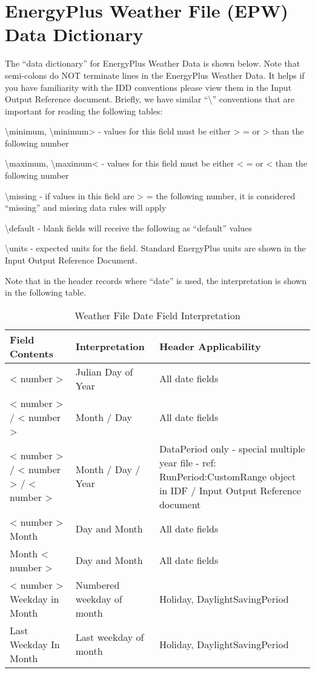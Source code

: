 \section{EnergyPlus Weather File (EPW) Data Dictionary}\label{energyplus-weather-file-epw-data-dictionary}

The ``data dictionary'' for EnergyPlus Weather Data is shown below. Note that semi-colons do NOT terminate lines in the EnergyPlus Weather Data. It helps if you have familiarity with the IDD conventions please view them in the Input Output Reference document. Briefly, we have similar ``\textbackslash{}'' conventions that are important for reading the following tables:

\textbackslash{}minimum, \textbackslash{}minimum\textgreater{} - values for this field must be either \textgreater{} = or \textgreater{} than the following number

\textbackslash{}maximum, \textbackslash{}maximum\textless{} - values for this field must be either \textless{} = or \textless{} than the following number

\textbackslash{}missing - if values in this field are \textgreater{} = the following number, it is considered ``missing'' and missing data rules will apply

\textbackslash{}default - blank fields will receive the following as ``default'' values

\textbackslash{}units - expected units for the field. Standard EnergyPlus units are shown in the Input Output Reference Document.

Note that in the header records where ``date'' is used, the interpretation is shown in the following table.

\begin{longtable}[c]{p{1.5in}p{1.5in}p{2.99in}}
\caption{Weather File Date Field Interpretation \protect \label{table:weather-file-date-field-interpretation}}\\
\toprule 
Field Contents & Interpretation & Header Applicability \tabularnewline \midrule
\endhead
< number > & Julian Day of Year & All date fields \tabularnewline
< number >  /  < number > & Month / Day & All date fields \tabularnewline
< number >  /  < number >  /  < number > & Month / Day / Year & DataPeriod only - special multiple year file - ref: RunPeriod:CustomRange object in IDF / Input Output Reference document \tabularnewline
< number >  Month & Day and Month & All date fields \tabularnewline
Month  < number > & Day and Month & All date fields \tabularnewline
< number >  Weekday in Month & Numbered weekday of month & Holiday, DaylightSavingPeriod \tabularnewline
Last Weekday In Month & Last weekday of month & Holiday, DaylightSavingPeriod \tabularnewline
\bottomrule
\end{longtable}

